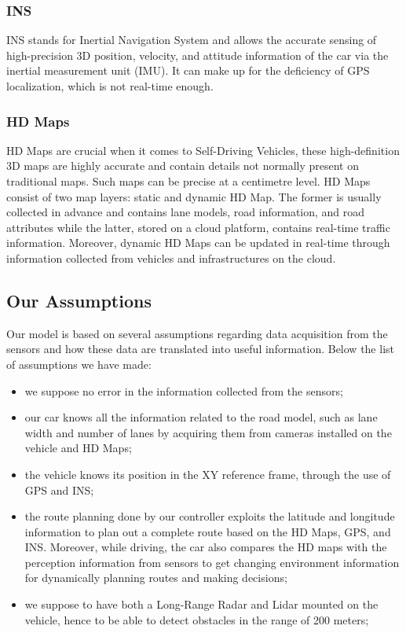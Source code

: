 \subsubsection{INS}
INS stands for Inertial Navigation System and allows the accurate sensing of high-precision 3D position, velocity, and attitude information of the car via the inertial measurement unit (IMU).
It can make up for the deficiency of GPS localization, which is not real-time enough.

\subsubsection{HD Maps}
HD Maps are crucial when it comes to Self-Driving Vehicles, these high-definition 3D maps are highly accurate and contain details not normally present on traditional maps. Such maps can be precise at a centimetre level.
HD Maps consist of two map layers: static and dynamic HD Map.
The former is usually collected in advance and contains lane models, road information, and road attributes while the latter, stored on a cloud platform, contains real-time traffic information. Moreover, dynamic HD Maps can be updated in real-time through information collected from vehicles and infrastructures on the cloud.

\subsection{Our Assumptions}

Our model is based on several assumptions regarding data acquisition from the sensors and how these data are translated into useful information. Below the list of assumptions we have made:
\begin{itemize}
    \item we suppose no error in the information collected from the sensors;
    \item our car knows all the information related to the road model, such as lane width and number of lanes by acquiring them from cameras installed on the vehicle and HD Maps;
    \item the vehicle knows its position in the XY reference frame, through the use of GPS and INS;
    \item the route planning done by our controller exploits the latitude and longitude information to plan out a complete route based on the HD Maps, GPS, and INS. Moreover, while driving, the car also compares the HD maps with the perception information from sensors to get changing environment information for dynamically planning routes and making decisions;
    \item we suppose to have both a Long-Range Radar and Lidar mounted on the vehicle, hence to be able to detect obstacles in the range of 200 meters;
\end{itemize}

